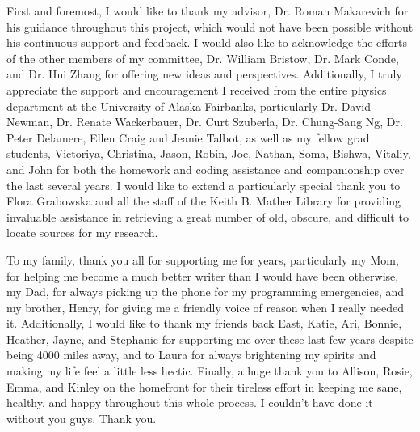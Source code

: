 
First and foremost, I would like to thank my advisor, Dr. Roman Makarevich for his guidance throughout this project, which would not have been possible without his continuous support and feedback.  I would also like to acknowledge the efforts of the other members of my committee, Dr. William Bristow, Dr. Mark Conde, and Dr. Hui Zhang for offering new ideas and perspectives.  Additionally, I truly appreciate the support and encouragement I received from the entire physics department at the University of Alaska Fairbanks, particularly Dr. David Newman, Dr. Renate Wackerbauer, Dr. Curt Szuberla, Dr. Chung-Sang Ng, Dr. Peter Delamere, Ellen Craig and Jeanie Talbot, as well as my fellow grad students, Victoriya, Christina, Jason, Robin, Joe, Nathan, Soma, Bishwa, Vitaliy, and John for both the homework and coding assistance and companionship over the last several years.  I would like to extend a particularly special thank you to Flora Grabowska and all the staff of the Keith B. Mather Library for providing invaluable assistance in retrieving a great number of old, obscure, and difficult to locate sources for my research.  

To my family, thank you all for supporting me for years, particularly my Mom, for helping me become a much better writer than I would have been otherwise, my Dad, for always picking up the phone for my programming emergencies, and my brother, Henry, for giving me a friendly voice of reason when I really needed it.  Additionally, I would like to thank my friends back East, Katie, Ari, Bonnie, Heather, Jayne, and Stephanie for supporting me over these last few years despite being 4000 miles away, and to Laura for always brightening my spirits and making my life feel a little less hectic.  Finally, a huge thank you to Allison, Rosie, Emma, and Kinley on the homefront for their tireless effort in keeping me sane, healthy, and happy throughout this whole process.  I couldn't have done it without you guys.  Thank you.